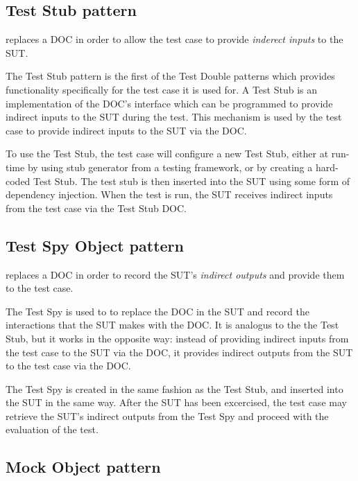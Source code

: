 
\subsection{Test Stub pattern}
\label{testdoubles:stub}

 replaces a DOC in order to allow the test case
to provide \textit{inderect inputs} to the SUT.

The Test Stub pattern is the first of the Test Double patterns which
provides functionality specifically for the test case it is used
for. A Test Stub is an implementation of the DOC's interface which can
be programmed to provide indirect inputs to the SUT during the
test. This mechanism is used by the test case to provide indirect
inputs to the SUT via the DOC.

To use the Test Stub, the test case will configure a new Test Stub,
either at run-time by using stub generator from a testing framework,
or by creating a hard-coded Test Stub. The test stub is then inserted
into the SUT using some form of dependency injection. When the test is
run, the SUT receives indirect inputs from the test case via the Test
Stub DOC.


\subsection{Test Spy Object pattern}
\label{testdoubles:spy}

 replaces a DOC in order to record the SUT's
\textit{indirect outputs} and provide them to the test case.

The Test Spy is used to to replace the DOC in the SUT and record
the interactions that the SUT makes with the DOC. It is analogus to
the the Test Stub, but it works in the opposite way: instead of
providing indirect inputs from the test case to the SUT via the DOC,
it provides indirect outputs from the SUT to the test case via the
DOC.

The Test Spy is created in the same fashion as the Test Stub, and
inserted into the SUT in the same way. After the SUT has been
excercised, the test case may retrieve the SUT's indirect outputs from
the Test Spy and proceed with the evaluation of the test.

\subsection{Mock Object pattern}
\label{testdoubles:mocks}

